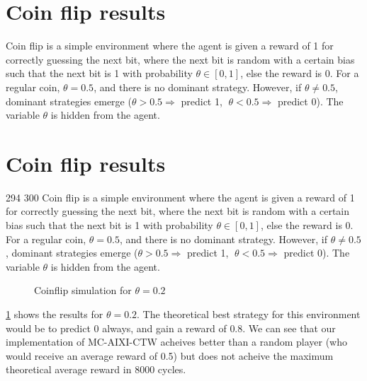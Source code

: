 \documentclass[pdftex,twoside,a4paper]{report}
\newcommand{\mac}{MC-AIXI-CTW}
\begin{document}
\section{Coin flip results}
Coin flip is a simple environment where the agent is given a reward of 1 for correctly guessing the next bit, where the next bit is random with a certain bias such that the next bit is 1 with probability $\theta \in [0,1]$, else the reward is 0. For a regular coin, $\theta = 0.5$, and there is no dominant strategy. However, if $\theta \not = 0.5$, dominant strategies emerge ($\theta > 0.5 \Rightarrow $ predict 1, $\; \theta < 0.5 \Rightarrow $ predict 0). The variable $\theta$ is hidden from the agent.
\section{Coin flip results}
294	 300	
 Coin flip is a simple environment where the agent is given a reward of 1 for correctly guessing the next bit, where the next bit is random with a certain bias such that the next bit is 1 with probability $\theta \in [0,1]$, else the reward is 0. For a regular coin, $\theta = 0.5$, and there is no dominant strategy. However, if $\theta \not = 0.5$, dominant strategies emerge ($\theta > 0.5 \Rightarrow $ predict 1, $\; \theta < 0.5 \Rightarrow $ predict 0). The variable $\theta$ is hidden from the agent.
\begin{figure}
\centering
\caption{Coinflip simulation for $\theta=0.2$}
\label{fig:coin_0_2}
\end{figure}
	
\ref{fig:coin_0_2} shows the results for $\theta=0.2$. The theoretical best strategy for this environment would be to predict $0$ always, and gain a reward of $0.8$. We can see that our implementation of \mac{} acheives better than a random player (who would receive an average reward of 0.5) but does not acheive the maximum theoretical average reward in 8000 cycles.
 
\end{document}
